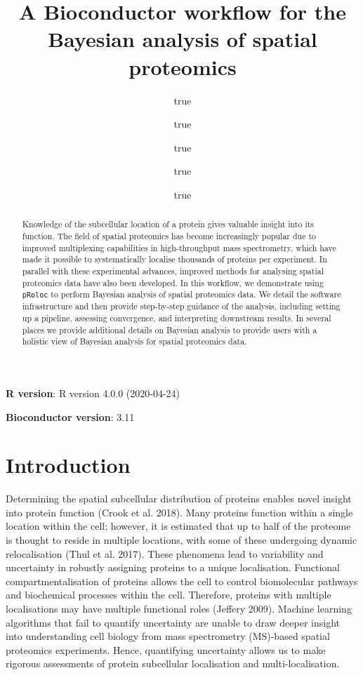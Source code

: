 \documentclass[
]{article}
\title{A Bioconductor workflow for the Bayesian analysis of spatial proteomics}
\author{true \and true \and true \and true \and true}
\date{}
\begin{document}
\maketitle
\begin{abstract}
Knowledge of the subcellular location of a protein gives valuable
insight into its function. The field of spatial proteomics has become
increasingly popular due to improved multiplexing capabilities in
high-throughput mass spectrometry, which have made it possible to
systematically localise thousands of proteins per experiment. In
parallel with these experimental advances, improved methods for
analysing spatial proteomics data have also been developed. In this
workflow, we demonstrate using \texttt{pRoloc} to perform Bayesian
analysis of spatial proteomics data. We detail the software
infrastructure and then provide step-by-step guidance of the analysis,
including setting up a pipeline, assessing convergence, and interpreting
downstream results. In several places we provide additional details on
Bayesian analysis to provide users with a holistic view of Bayesian
analysis for spatial proteomics data.
\end{abstract}

\newcommand{\diag}{\mathop{\mathrm{diag}}}

\textbf{R version}: R version 4.0.0 (2020-04-24)

\textbf{Bioconductor version}: 3.11

\hypertarget{introduction}{%
\section{Introduction}\label{introduction}}

Determining the spatial subcellular distribution of proteins enables
novel insight into protein function (Crook et al. 2018). Many proteins
function within a single location within the cell; however, it is
estimated that up to half of the proteome is thought to reside in
multiple locations, with some of these undergoing dynamic relocalisation
(Thul et al. 2017). These phenomena lead to variability and uncertainty
in robustly assigning proteins to a unique localisation. Functional
compartmentalisation of proteins allows the cell to control biomolecular
pathways and biochemical processes within the cell. Therefore, proteins
with multiple localisations may have multiple functional roles (Jeffery
2009). Machine learning algorithms that fail to quantify uncertainty are
unable to draw deeper insight into understanding cell biology from mass
spectrometry (MS)-based spatial proteomics experiments. Hence,
quantifying uncertainty allows us to make rigorous assessments of
protein subcellular localisation and multi-localisation.
\end{document}
